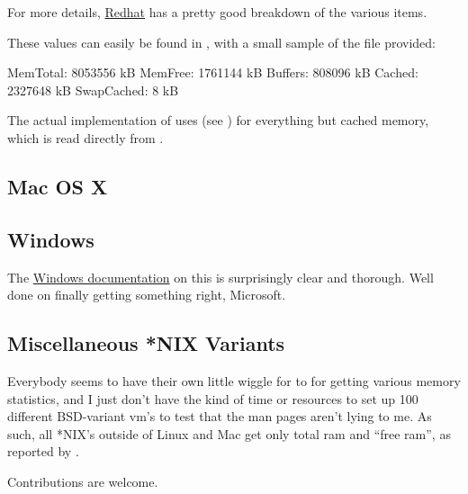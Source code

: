 For more details, \href{https://www.redhat.com/advice/tips/meminfo.html}{Redhat} has a pretty good breakdown of the various items.


These values can easily be found in , with a small sample of the file provided:

\begin{center}
\begin{minipage}{.4\textwidth}
\begin{Output}
MemTotal:        8053556 kB
MemFree:         1761144 kB
Buffers:          808096 kB
Cached:          2327648 kB
SwapCached:            8 kB
\end{Output}
\end{minipage}
\end{center}

The actual implementation of  uses  (see ) for everything but cached memory, which is read directly from .





\subsection{Mac OS X}






\subsection{Windows}

The \href{http://msdn.microsoft.com/en-us/library/windows/desktop/aa366589%28v=vs.85%29.aspx}{Windows documentation} 
on this is surprisingly clear and thorough.  Well done on finally getting something right, Microsoft.






\subsection{Miscellaneous *NIX Variants}

Everybody seems to have their own little wiggle for to  for getting various memory statistics, and I just don't have the kind of time or resources to set up 100 different BSD-variant vm's to test that the man pages aren't lying to me.  As such, all *NIX's outside of Linux and Mac get only total ram and ``free ram'', as reported by .

Contributions are welcome.


